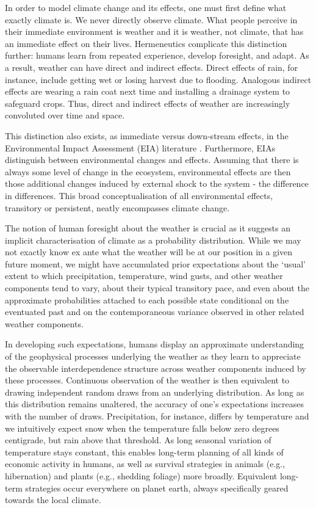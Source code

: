 \documentclass[a4paper,12pt]{article}
\theoremstyle{plain}
\theoremstyle{definition}
\theoremstyle{definition}
\theoremstyle{definition}
\theoremstyle{definition}
\begin{document}
In order to model climate change and its effects, one must first define what exactly climate is. We never directly observe climate. What people perceive in their immediate environment is weather and it is weather, not climate, that has an immediate effect on their lives. Hermeneutics complicate this distinction further: humans learn from repeated experience, develop foresight, and adapt. As a result, weather can have direct and indirect effects. Direct effects of rain, for instance, include getting wet or losing harvest due to flooding. Analogous indirect effects are wearing a rain coat next time and installing a drainage system to safeguard crops. Thus, direct and indirect effects of weather are increasingly convoluted over time and space.

This distinction also exists, as immediate versus down-stream effects, in the Environmental Impact Assessment (EIA) literature \citep[see e.g.,][]{Noble2015}. Furthermore, EIAs distinguish between environmental changes and effects. Assuming that there is always some level of change in the ecosystem, environmental effects are then those additional changes induced by external shock to the system - the difference in differences. This broad conceptualisation of all environmental effects, transitory or persistent, neatly encompasses climate change.

The notion of human foresight about the weather is crucial as it suggests an implicit characterisation of climate as a probability distribution. While we may not exactly know ex ante what the weather will be at our position in a given future moment, we might have accumulated prior expectations about the `usual' extent to which precipitation, temperature, wind gusts, and other weather components tend to vary, about their typical transitory pace, and even about the approximate probabilities attached to each possible state conditional on the eventuated past and on the contemporaneous variance observed in other related weather components.

In developing such expectations, humans display an approximate understanding of the geophysical processes underlying the weather as they learn to appreciate the observable interdependence structure across weather components induced by these processes. Continuous observation of the weather is then equivalent to drawing independent random draws from an underlying distribution. As long as this distribution remains unaltered, the accuracy of one's expectations increases with the number of draws. Precipitation, for instance, differs by temperature and we intuitively expect snow when the temperature falls below zero degrees centigrade, but rain above that threshold. As long seasonal variation of temperature stays constant, this enables long-term planning of all kinds of economic activity in humans, as well as survival strategies in animals (e.g., hibernation) and plants (e.g., shedding foliage) more broadly. Equivalent long-term strategies occur everywhere on planet earth, always specifically geared towards the local climate.
\end{document}
